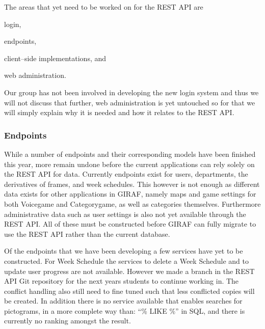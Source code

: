 The areas that yet need to be worked on for the REST API are
\begin{enumberate*}
\item login, 
\item endpoints, 
\item client--side implementations, and 
\item web administration.
\end{enumberate*} 
Our group has not been involved in developing the new login system and thus we will not discuss that further, web administration is yet untouched so for that we will simply explain why it is needed and how it relates to the REST API.


\subsubsection*{Endpoints}
While a number of endpoints and their corresponding models have been finished this year, more remain undone before the current applications can rely solely on the REST API for data.
Currently endpoints exist for users, departments, the derivatives of frames, and week schedules.
This however is not enough as different data exists for other applications in GIRAF, namely maps and game settings for both Voicegame and Categorygame, as well as categories themselves. 
Furthermore administrative data such as user settings is also not yet available through the REST API.
All of these must be constructed before GIRAF can fully migrate to use the REST API rather than the current database.

Of the endpoints that we have been developing a few services have yet to be constructed.
For Week Schedule the services to delete a Week Schedule and to update user progress are not available.
However we made a branch in the REST API Git repository for the next years students to continue working in.
The conflict handling also still need to fine tuned such that less conflicted copies will be created. 
In addition there is no service available that enables searches for pictograms, in a more complete way than: ``\% LIKE \%'' in SQL, and there is currently no ranking amongst the result.


